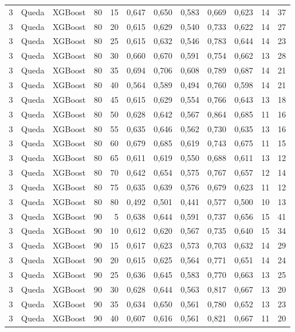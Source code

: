 \begin{longtable}{@{}rllrrrrrrrrr@{}}
3 & Queda & XGBoost & 80 & 15 & 0,647 & 0,650 & 0,583 & 0,669 & 0,623 & 14 & 37 \\
3 & Queda & XGBoost & 80 & 20 & 0,615 & 0,629 & 0,540 & 0,733 & 0,622 & 14 & 27 \\
3 & Queda & XGBoost & 80 & 25 & 0,615 & 0,632 & 0,546 & 0,783 & 0,644 & 14 & 23 \\
3 & Queda & XGBoost & 80 & 30 & 0,660 & 0,670 & 0,591 & 0,754 & 0,662 & 13 & 28 \\
3 & Queda & XGBoost & 80 & 35 & 0,694 & 0,706 & 0,608 & 0,789 & 0,687 & 14 & 21 \\
3 & Queda & XGBoost & 80 & 40 & 0,564 & 0,589 & 0,494 & 0,760 & 0,598 & 14 & 21 \\
3 & Queda & XGBoost & 80 & 45 & 0,615 & 0,629 & 0,554 & 0,766 & 0,643 & 13 & 18 \\
3 & Queda & XGBoost & 80 & 50 & 0,628 & 0,642 & 0,567 & 0,864 & 0,685 & 11 & 16 \\
3 & Queda & XGBoost & 80 & 55 & 0,635 & 0,646 & 0,562 & 0,730 & 0,635 & 13 & 16 \\
3 & Queda & XGBoost & 80 & 60 & 0,679 & 0,685 & 0,619 & 0,743 & 0,675 & 11 & 15 \\
3 & Queda & XGBoost & 80 & 65 & 0,611 & 0,619 & 0,550 & 0,688 & 0,611 & 13 & 12 \\
3 & Queda & XGBoost & 80 & 70 & 0,642 & 0,654 & 0,575 & 0,767 & 0,657 & 12 & 14 \\
3 & Queda & XGBoost & 80 & 75 & 0,635 & 0,639 & 0,576 & 0,679 & 0,623 & 11 & 12 \\
3 & Queda & XGBoost & 80 & 80 & 0,492 & 0,501 & 0,441 & 0,577 & 0,500 & 10 & 13 \\
3 & Queda & XGBoost & 90 & 5 & 0,638 & 0,644 & 0,591 & 0,737 & 0,656 & 15 & 41 \\
3 & Queda & XGBoost & 90 & 10 & 0,612 & 0,620 & 0,567 & 0,735 & 0,640 & 15 & 34 \\
3 & Queda & XGBoost & 90 & 15 & 0,617 & 0,623 & 0,573 & 0,703 & 0,632 & 14 & 29 \\
3 & Queda & XGBoost & 90 & 20 & 0,615 & 0,625 & 0,564 & 0,771 & 0,651 & 14 & 24 \\
3 & Queda & XGBoost & 90 & 25 & 0,636 & 0,645 & 0,583 & 0,770 & 0,663 & 13 & 25 \\
3 & Queda & XGBoost & 90 & 30 & 0,628 & 0,644 & 0,563 & 0,817 & 0,667 & 13 & 20 \\
3 & Queda & XGBoost & 90 & 35 & 0,634 & 0,650 & 0,561 & 0,780 & 0,652 & 13 & 23 \\
3 & Queda & XGBoost & 90 & 40 & 0,607 & 0,616 & 0,561 & 0,821 & 0,667 & 11 & 20 \\

\end{longtable}
